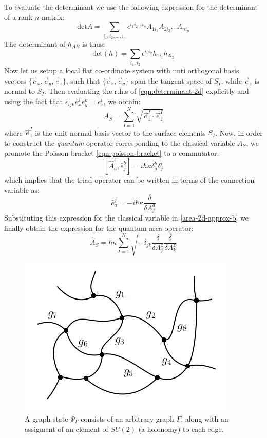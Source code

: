 \documentclass{ws-mpla}
\begin{document}
To evaluate the determinant we use the following expression for the determinant of a rank $ n $ matrix:
\begin{equation}\label{eqn:determinant}
	\text{det} A = \sum_{i_1, i_2, \ldots,i_n} \epsilon^{i_1 i_2 \ldots i_n} A_{1 i_1} A_{2 i_2}\ldots A_{n i_n}
\end{equation}
The determinant of $ h_{AB} $ is thus:
\begin{equation}\label{eqn:determinant-2d}
	\text{det} (h) = \sum_{i_1,i_2} \epsilon^{i_1 i_2} h_{1 i_1} h_{2 i_2}
\end{equation}
Now let us setup a local flat co-ordinate system with unti orthogonal basis vectors $ \{\vec{e}_x, \vec{e}_y, \vec{e}_z\} $, such that $ \{ \vec{e}_x, \vec{e}_y \} $ span the tangent space of $ S_I $, while $ \vec{e}_z $ is normal to $ S_I $. Then evaluating the r.h.s of \eqref{eqn:determinant-2d} explicitly and using the fact that $ \epsilon_{ijk} e_x^j e_y^k = e_z^i $, we obtain:
\begin{equation}\label{area-2d-approx-b}
	A_S = \sum_{I=1}^N \sqrt{\vec{e}^I_z \cdot \vec{e}^I_z}
\end{equation}
where $ \vec{e}^I_z $ is the unit normal basis vector to the surface elements $ S_I $. Now, in order to construct the \emph{quantum} operator corresponding to the classical variable $ A_S $, we promote the Poisson bracket \eqref{eqn:poisson-bracket} to a commutator:
\begin{equation}\label{eqn:lqg-commutator}
[ \hat A_a^i, \hat e^b_j ] = i \hbar \kappa \delta^b_a \delta^i_j
\end{equation}
which implies that the triad operator can be written in terms of the connection variable as:
\begin{equation}\label{eqn:triad-operator}
	\hat e_a^j = -i\hbar \kappa \frac{\delta}{\delta A^a_j}
\end{equation}
Substituting this expression for the classical variable in \eqref{area-2d-approx-b} we finally obtain the expression for the quantum area operator:
\begin{equation}\label{eqn:area-quantum}
	\hat A_S = \hbar \kappa \sum_{I=1}^N \sqrt{ - \delta_{jk} \frac{\delta}{\delta A^z_j} \frac{\delta}{\delta A^z_k}} 
\end{equation}

\begin{figure}[tbph]
\centering
\includegraphics[width=0.4\linewidth]{network-labelled-g}
\caption{A graph state $ \Psi_\Gamma $ consists of an arbitrary graph $ \Gamma $, along with an assigment of an element of $ SU(2) $ (a holonomy) to each edge.}
\label{fig:graph-state}
\end{figure}
\end{document}
